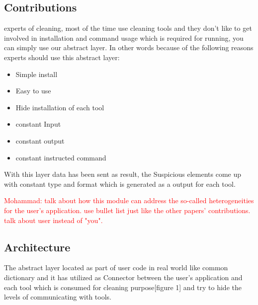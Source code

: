 \documentclass[12pt]{article}
\newcommand{\mohammad}[1]{\textcolor{red}{Mohammad: #1}}
\begin{document}
\subsection{Contributions}
experts of cleaning, most of the time use cleaning tools and they don't like to get involved in installation and command usage which is required for running, you can simply use our abstract layer.
In other words because of the following reasons experts should use this abstract layer:
\begin{itemize}
	\item Simple install
	\item Easy to use
	\item Hide installation of each tool
	\item constant Input
	\item constant output 
	\item constant instructed command 
	
\end{itemize}
With this layer data has been sent as result, the Suspicious elements come up with  constant type and format which is generated as a output for each tool.

\mohammad{talk about how this module can address the so-called heterogeneities for the user's application. use bullet list just like the other papers' contributions. talk about user instead of "you".}

\subsection{Architecture}
The abstract layer located as part of user code in real world like common dictionary and it has utilized as Connector between the user's application and each tool which is consumed for cleaning purpose[figure 1] and try to hide the levels of communicating with tools.
\end{document}

